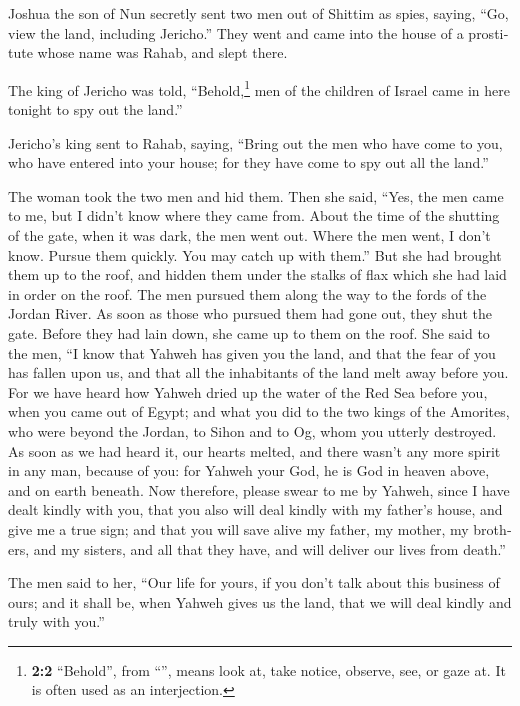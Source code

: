 \begin{paracol}{2}
\begin{otherlanguage}{english}
 Joshua the son of Nun secretly sent two men out of
Shittim as spies, saying, ``Go, view the land, including Jericho.'' They
went and came into the house of a prostitute whose name was Rahab, and
slept there.

 The king of Jericho was told, ``Behold,\footnote{\textbf{2:2}
  ``Behold'', from ``'', means look at, take notice,
  observe, see, or gaze at. It is often used as an interjection.} men of
the children of Israel came in here tonight to spy out the land.''

 Jericho's king sent to Rahab, saying, ``Bring out the men
who have come to you, who have entered into your house; for they have
come to spy out all the land.''

 The woman took the two men and hid them. Then she said,
``Yes, the men came to me, but I didn't know where they came from.
 About the time of the shutting of the gate, when it was
dark, the men went out. Where the men went, I don't know. Pursue them
quickly. You may catch up with them.''  But she had
brought them up to the roof, and hidden them under the stalks of flax
which she had laid in order on the roof.  The men pursued
them along the way to the fords of the Jordan River. As soon as those
who pursued them had gone out, they shut the gate.  Before
they had lain down, she came up to them on the roof.  She
said to the men, ``I know that Yahweh has given you the land, and that
the fear of you has fallen upon us, and that all the inhabitants of the
land melt away before you.  For we have heard how Yahweh
dried up the water of the Red Sea before you, when you came out of
Egypt; and what you did to the two kings of the Amorites, who were
beyond the Jordan, to Sihon and to Og, whom you utterly destroyed.
 As soon as we had heard it, our hearts melted, and there
wasn't any more spirit in any man, because of you: for Yahweh your God,
he is God in heaven above, and on earth beneath.  Now
therefore, please swear to me by Yahweh, since I have dealt kindly with
you, that you also will deal kindly with my father's house, and give me
a true sign;  and that you will save alive my father, my
mother, my brothers, and my sisters, and all that they have, and will
deliver our lives from death.''

 The men said to her, ``Our life for yours, if you don't
talk about this business of ours; and it shall be, when Yahweh gives us
the land, that we will deal kindly and truly with you.''


\end{otherlanguage}
\end{paracol}
